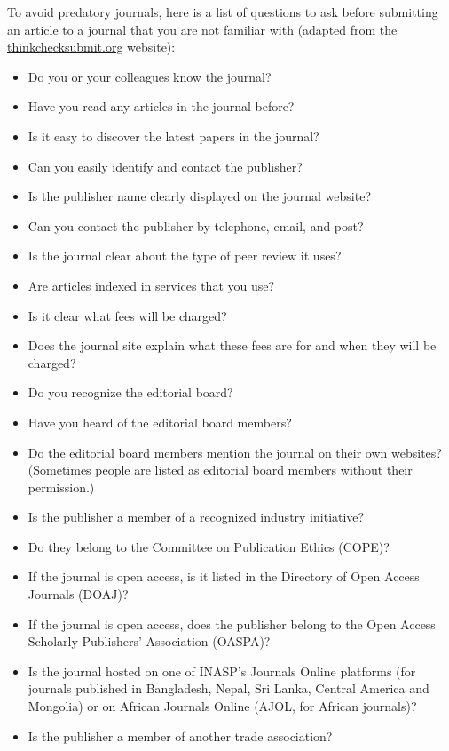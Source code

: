 To avoid predatory journals, here is a list of questions to ask before submitting an article to a journal that you are not familiar with (adapted from the \href{http://thinkchecksubmit.org}{thinkchecksubmit.org} website):

\begin{itemize}
  \item Do you or your colleagues know the journal?
  \item Have you read any articles in the journal before?
  \item Is it easy to discover the latest papers in the journal?
  \item Can you easily identify and contact the publisher?
  \item Is the publisher name clearly displayed on the journal website?
  \item Can you contact the publisher by telephone, email, and post?
  \item Is the journal clear about the type of peer review it uses?
  \item Are articles indexed in services that you use?
  \item Is it clear what fees will be charged?
  \item Does the journal site explain what these fees are for and when they will be charged?
  \item Do you recognize the editorial board?
  \item Have you heard of the editorial board members?
  \item Do the editorial board members mention the journal on their own websites? (Sometimes people are listed as editorial board members without their permission.)
  \item Is the publisher a member of a recognized industry initiative?
  \item Do they belong to the Committee on Publication Ethics (COPE)?
  \item If the journal is open access, is it listed in the Directory of Open Access Journals (DOAJ)?
  \item If the journal is open access, does the publisher belong to the Open Access Scholarly Publishers' Association (OASPA)?
  \item Is the journal hosted on one of INASP's Journals Online platforms (for journals published in Bangladesh, Nepal, Sri Lanka, Central America and Mongolia) or on African Journals Online (AJOL, for African journals)?
  \item Is the publisher a member of another trade association?
\end{itemize}

